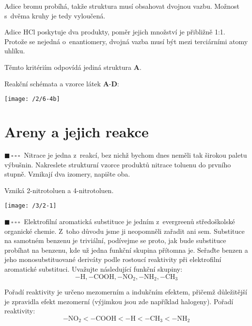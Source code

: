 \documentclass{book}
\newcommand{\jeden}{$\blacksquare \, \square \, \square \, \square \; \; $}
\renewenvironment{quotation}{\par}{\par} %
\begin{document}
Adice bromu probíhá, takže struktura musí obsahovat dvojnou vazbu.
Možnost s~dvěma kruhy je tedy vyloučená. 

Adice HCl poskytuje dva produkty, poměr jejich množství je přibližně
1:1. Protože se nejedná o~enantiomery, dvojná vazba musí být mezi
terciárními atomy uhlíku.

Těmto kritériím odpovídá jediná struktura \textbf{A}.

Reakční schémata a vzorce látek \textbf{A}-\textbf{D}:

\begin{center}
\texttt{[image: /2/6-4b]}
\end{center}


\section{Areny a jejich reakce}

\begin{quotation}
\jeden Nitrace je jedna z~reakcí, bez nichž bychom dnes neměli tak širokou
paletu výbušnin. Nakreslete strukturní vzorce produktů nitrace toluenu
do prvního stupně. Vznikají dva izomery, napište oba.
\end{quotation} \dotfill \par 
Vzniká 2-nitrotoluen a 4-nitrotoluen. 
\noindent \begin{center}

\texttt{[image: /3/2-1]}

\par\end{center}

\hrulefill %
\begin{quotation}
\jeden Elektrofilní aromatická substituce je jedním z~evergreenů středoškolské
organické chemie. Z~toho důvodu jsme ji neopomněli zařadit ani sem.
Substituce na samotném benzenu je triviální, podívejme se proto, jak
bude substituce probíhat na benzenu, kde už jedna funkční skupina
přítomna je. Seřaďte benzen a jeho monosubstituované deriváty podle
rostoucí reaktivity při elektrofilní aromatické substituci. Uvažujte
následující funkční skupiny: 
\[
\mathrm{-H,-COOH,-NO_{2},-NH_{2},-CH_{3}}
\]
\end{quotation} \dotfill \par 
Pořadí reaktivity je určeno mezomerním a indukčním efektem, přičemž
důležitější je zpravidla efekt mezomerní (výjimkou jsou zde například
halogeny). Pořadí reaktivity: 
\[
\mathrm{-NO_{2} < -COOH < -H < -CH_{3} < -NH_{2}}
\]
\end{document}
